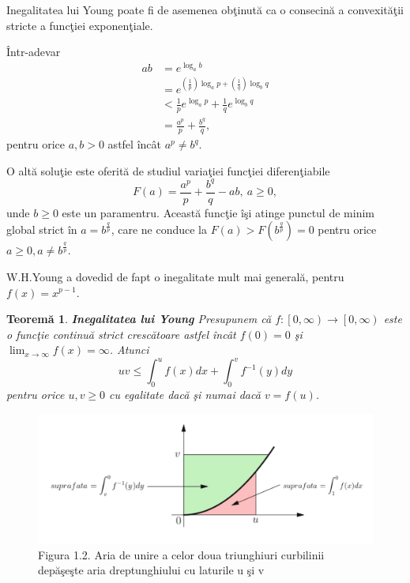 \documentclass[a4paper,12pt,oneside]{report}
\newtheorem{theorem}{Teorem\u a}
\begin{document}
Inegalitatea lui Young poate fi de asemenea ob\c{t}inut\u{a} ca o consecin\u{a} a convexit\u{a}\c{t}ii stricte a func\c{t}iei exponen\c{t}iale.

\^{I}ntr-adevar
\begin{equation} \nonumber
    \begin{split}
        ab & =  e^{\log_{a}b} \\ & = e^{\left (\frac{1}{p}  \right )\log_{a}p+ \left ( \frac{1}{q} \right )\log_{b}q} \\ & < \frac{1}{p}e^{\log_{a}p}+\frac{1}{q}e^{\log_{b}q} \\ & = \frac{a^{p}}{p}+\frac{b^{q}}{q},
    \end{split}
\end{equation}
pentru orice \(a,b>0\) astfel \^{i}nc\^{a}t \(a^{p}\neq b^{q}\).

O alt\u{a} solu\c{t}ie este oferit\u{a} de studiul varia\c{t}iei func\c{t}iei diferen\c{t}iabile
\begin{displaymath}
  F\left ( a \right )= \frac{a^{p}}{p}+\frac{b^{q}}{q} - ab,~ a\geq 0,
\end{displaymath}
unde \(b\geq 0\) este un paramentru. Aceast\u{a} func\c{t}ie \^{i}\c{s}i atinge punctul de minim global strict \^{i}n \(a= b^{\frac{q}{p}}\), care ne conduce la \(F\left ( a \right )> F\left ( b^{\frac{q}{p}} \right ) = 0\) pentru orice \(a\geq 0, a\neq b^{\frac{q}{p}}\).

  W.H.Young a dovedid de fapt  o inegalitate mult mai general\u{a}, pentru \(f\left ( x \right )=  x^{p-1}\).

\begin{theorem}
\textbf{Inegalitatea lui Young
}
Presupunem c\u{a} \(f: \left [ 0,\infty  \right ) \rightarrow \left [ 0,\infty  \right )\) este o func\c{t}ie continu\u{a} strict cresc\u{a}toare astfel \^{i}nc\^{a}t \(f\left ( 0 \right )= 0\) \c{s}i \(\lim_{x\rightarrow \infty }f\left ( x \right )= \infty\). Atunci
\begin{displaymath}
  uv\leq \int_{0}^{u}f\left ( x \right )dx + \int_{0}^{v}f^{-1}\left ( y \right )dy
\end{displaymath}
pentru orice \(u,v\geq 0\) cu egalitate dac\u{a} \c{s}i numai dac\u{a} \( v = f\left ( u \right )\).
\end{theorem}

\begin{figure}[htbp]
	\centering
	\includegraphics[width=1.0\textwidth]{fig1.2.png}
	\caption{Figura 1.2. Aria  de unire a celor doua triunghiuri curbilinii dep\u{a}\c{s}e\c{s}te aria dreptunghiului cu laturile u \c{s}i v}
\end{figure}
\end{document}
